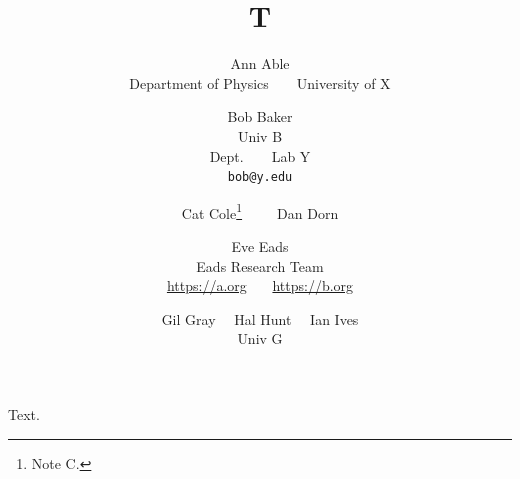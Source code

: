 \documentclass{article}
\title{T}
\author{Ann Able \\ Department of Physics~~~~University of X
\and Bob Baker \\ Univ B \\ Dept.~~~~Lab Y \\ \texttt{bob@y.edu}
\and Cat Cole\thanks{Note C.}~~\icon~~~Dan Dorn
\and Eve Eads \\ \raisebox{-0.3ex}{\rule[0.1ex]{1em}{1ex}}\;\;Eads Research Team \\
\url{https://a.org}~~~ \url{https://b.org}
\and {Gil Gray}~~ {Hal Hunt}~~ {Ian Ives} \\ Univ G}
\begin{document}
\maketitle
Text.
\end{document}
